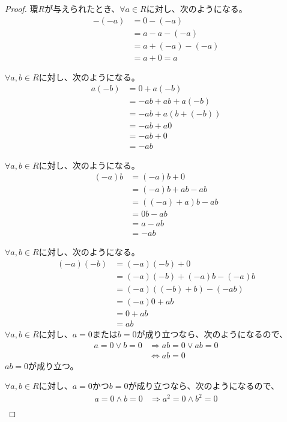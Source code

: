 \documentclass[dvipdfmx]{jsarticle}
\begin{document}
\begin{proof} 環$R$が与えられたとき、$\forall a\in R$に対し、次のようになる。
\begin{align*}
- ( - a) &= 0 - ( - a)\\
&= a - a - ( - a)\\
&= a + ( - a) - ( - a)\\
&= a + 0 = a
\end{align*}\par
$\forall a,b\in R$に対し、次のようになる。
\begin{align*}
a( - b) &= 0 + a( - b)\\
&= - ab + ab + a( - b)\\
&= - ab + a\left( b + ( - b) \right)\\
&= - ab + a0\\
&= - ab + 0\\
&= - ab
\end{align*}\par
$\forall a,b\in R$に対し、次のようになる。
\begin{align*}
( - a)b &= ( - a)b + 0\\
&= ( - a)b + ab - ab\\
&= \left( ( - a) + a \right)b - ab\\
&= 0b - ab\\
&= a - ab\\
&= - ab
\end{align*}\par
$\forall a,b\in R$に対し、次のようになる。
\begin{align*}
( - a)( - b) &= ( - a)( - b) + 0\\
&= ( - a)( - b) + ( - a)b - ( - a)b\\
&= ( - a)\left( ( - b) + b \right) - ( - ab)\\
&= ( - a)0 + ab\\
&= 0 + ab\\
&= ab
\end{align*}
$\forall a,b\in R$に対し、$a=0$または$b=0$が成り立つなら、次のようになるので、
\begin{align*}
a = 0 \vee b = 0 &\Rightarrow ab = 0 \vee ab = 0\\
&\Leftrightarrow ab = 0
\end{align*}
$ab=0$が成り立つ。\par
$\forall a,b\in R$に対し、$a=0$かつ$b=0$が成り立つなら、次のようになるので、
\begin{align*}
a = 0 \land b = 0 &\Rightarrow a^{2} = 0 \land b^{2} = 0\\

\end{align*}
\end{proof}
\end{document}
